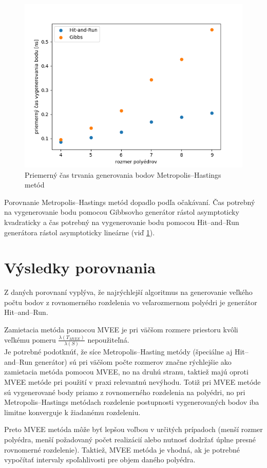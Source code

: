 \begin{figure} [H]
  \includegraphics[width=\linewidth]{images/mh.png}
  \caption{Priemerný čas trvania generovania bodov Metropolis--Hastings metód}
  \label{fig:mh}
\end{figure}

Porovnanie Metropolis--Hastings metód dopadlo podľa očakávaní. Čas potrebný na vygenerovanie bodu pomocou Gibbsovho generátor rástol asymptoticky kvadraticky a čas potrebný na vygenerovanie bodu pomocou Hit--and--Run generátora rástol asymptoticky lineárne (viď \ref{fig:mh}).\\

\section{Výsledky porovnania}

Z daných porovnaní vyplýva, že najrýchlejší algoritmus na generovanie veľkého počtu bodov z rovnomerného rozdelenia vo veľarozmernom polyédri je generátor Hit--and--Run.

Zamietacia metóda pomocou MVEE je pri väčšom rozmere priestoru kvôli veľkému pomeru $\frac{\lambda(T_{MVEE})}{\lambda(S)}$ nepoužiteľná.\\

Je potrebné podotknúť, že síce Metropolis--Hasting metódy (špeciálne aj Hit--and--Run generátor) sú pri väčšom počte rozmerov značne rýchlejšie ako zamietacia metóda pomocou MVEE, no na druhú stranu, taktiež majú oproti MVEE metóde pri použití v praxi relevantnú nevýhodu. Totiž pri MVEE metóde sú vygenerované body priamo z rovnomerného rozdelenia na polyédri, no pri Metropolis--Hastings metódach rozdelenie postupnosti vygenerovaných bodov iba limitne konverguje k žiadanému rozdeleniu.

Preto MVEE metóda môže byť lepšou voľbou v určitých prípadoch (menší rozmer polyédra, menší požadovaný počet realizácií alebo nutnosť dodržať úplne presné rovnomerné rozdelenie). Taktiež, MVEE metóda je vhodná, ak je potrebné vypočítať intervaly spoľahlivosti pre objem daného polyédra. 